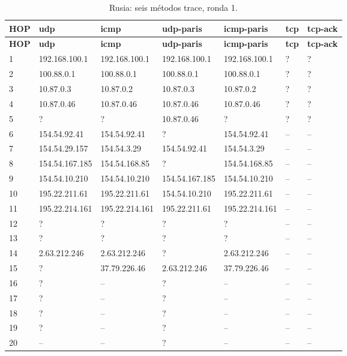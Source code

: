\begin{longtable}{p{0.8cm}p{2.25cm}p{2.25cm}p{2.25cm}p{2.25cm}p{2.25cm}p{2.25cm}}
\caption{Rusia: seis métodos trace, ronda 1.}\label{anexo:trace:37.79.226.46:1} \\
\toprule
\textbf{HOP} & \textbf{udp} & \textbf{icmp} & \textbf{udp-paris} & \textbf{icmp-paris} & \textbf{tcp} & \textbf{tcp-ack} \\ \midrule
\endfirsthead
\toprule
\textbf{HOP} & \textbf{udp} & \textbf{icmp} & \textbf{udp-paris} & \textbf{icmp-paris} & \textbf{tcp} & \textbf{tcp-ack} \\ \midrule
\endhead
1 & 192.168.100.1 & 192.168.100.1 & 192.168.100.1 & 192.168.100.1 & ? & ? \\
2 & 100.88.0.1 & 100.88.0.1 & 100.88.0.1 & 100.88.0.1 & ? & ? \\
3 & 10.87.0.3 & 10.87.0.2 & 10.87.0.3 & 10.87.0.2 & ? & ? \\
4 & 10.87.0.46 & 10.87.0.46 & 10.87.0.46 & 10.87.0.46 & ? & ? \\
5 & ? & ? & 10.87.0.46 & ? & ? & ? \\
6 & 154.54.92.41 & 154.54.92.41 & ? & 154.54.92.41 & -- & -- \\
7 & 154.54.29.157 & 154.54.3.29 & 154.54.92.41 & 154.54.3.29 & -- & -- \\
8 & 154.54.167.185 & 154.54.168.85 & ? & 154.54.168.85 & -- & -- \\
9 & 154.54.10.210 & 154.54.10.210 & 154.54.167.185 & 154.54.10.210 & -- & -- \\
10 & 195.22.211.61 & 195.22.211.61 & 154.54.10.210 & 195.22.211.61 & -- & -- \\
11 & 195.22.214.161 & 195.22.214.161 & 195.22.211.61 & 195.22.214.161 & -- & -- \\
12 & ? & ? & ? & ? & -- & -- \\
13 & ? & ? & ? & ? & -- & -- \\
14 & 2.63.212.246 & 2.63.212.246 & ? & 2.63.212.246 & -- & -- \\
15 & ? & 37.79.226.46 & 2.63.212.246 & 37.79.226.46 & -- & -- \\
16 & ? & -- & ? & -- & -- & -- \\
17 & ? & -- & ? & -- & -- & -- \\
18 & ? & -- & ? & -- & -- & -- \\
19 & ? & -- & ? & -- & -- & -- \\
20 & -- & -- & ? & -- & -- & -- \\
\bottomrule
\end{longtable}
